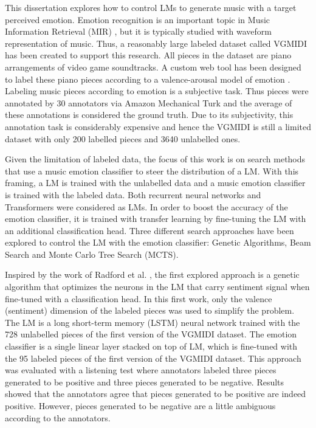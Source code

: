 This dissertation explores how to control LMs to generate music with a target perceived emotion. Emotion recognition is an important topic in Music Information Retrieval (MIR) \cite{kim2010music}, but it is typically studied with waveform representation of music. Thus, a reasonably large labeled dataset called VGMIDI has been created to support this research. All pieces in the dataset are piano arrangements of video game soundtracks. A custom web tool has been designed to label these piano pieces according to a valence-arousal model of emotion \cite{russell1980circumplex}. Labeling music pieces according to emotion is a subjective task. Thus pieces were annotated by 30 annotators via Amazon Mechanical Turk and the average of these annotations is considered the ground truth. Due to its subjectivity, this annotation task is considerably expensive and hence the VGMIDI is still a limited dataset with only 200 labelled pieces and 3640 unlabelled ones.

Given the limitation of labeled data, the focus of this work is on search methods that use a music emotion classifier to steer the distribution of a LM. With this framing, a LM is trained with the unlabelled data and a music emotion classifier is trained with the labeled data. Both recurrent neural networks and Transformers were considered as LMs. In order to boost the accuracy of the emotion classifier, it is trained with transfer learning by fine-tuning the LM with an additional classification head. Three different search approaches have been explored to control the LM with the emotion classifier: Genetic Algorithms, Beam Search and Monte Carlo Tree Search (MCTS).

Inspired by the work of Radford et al. \cite{radford_2017}, the first explored approach is a genetic algorithm that optimizes the neurons in the LM that carry sentiment signal when fine-tuned with a classification head. In this first work, only the valence (sentiment) dimension of the labeled pieces was used to simplify the problem. The LM is a long short-term memory (LSTM) neural network trained with the 728 unlabelled pieces of the first version of the VGMIDI dataset. The emotion classifier is a single linear layer stacked on top of LM, which is fine-tuned with the 95 labeled pieces of the first version of the VGMIDI dataset. This approach was evaluated with a listening test where annotators labeled three pieces generated to be positive and three pieces generated to be negative. Results showed that the annotators agree that pieces generated to be positive are indeed positive. However, pieces generated to be negative are a little ambiguous according to the annotators.

